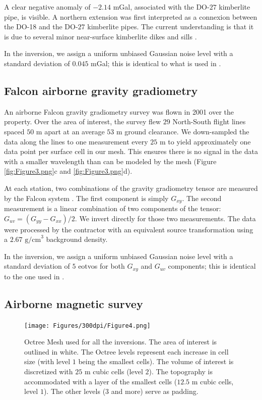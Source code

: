 \documentclass[paper, twocolumn]{geophysics} %
\begin{document}
A clear negative anomaly of $-2.14$ mGal, associated with the DO-$27$ kimberlite pipe, is visible. A northern extension was first interpreted as a connexion between the DO-18 and the DO-$27$ kimberlite pipes. The current understanding is that it is due to several minor near-surface kimberlite dikes and sills \citep{Doyle}.

In the inversion, we assign a uniform unbiased Gaussian noise level with a standard deviation of $0.045$ mGal; this is identical to what is used in \citet{TKCpaper}.

\subsection{Falcon airborne gravity gradiometry}

An airborne Falcon gravity gradiometry survey was flown in 2001 over the property. Over the area of interest, the survey flew $29$ North-South flight lines spaced $50$ m apart at an average $53$ m ground clearance. We down-sampled the data along the lines to one measurement every $25$ m to yield approximately one data point per surface cell in our mesh. This ensures there is no signal in the data with a smaller wavelength than can be modeled by the mesh (Figure \ref{fig:Figure3.png}c and \ref{fig:Figure3.png}d).

At each station, two combinations of the gravity gradiometry tensor \citep{GG} are measured by the Falcon system \citep{FalconPaper}. The first component is simply $G_{xy}$. The second measurement is a linear combination of two components of the tensor: $G_{uv} = (G_{yy}-G_{xx}) / 2$. We invert directly for those two measurements. The data were processed by the contractor with an equivalent source transformation using a $2.67 \text{ g/cm}^3$ background density.

In the inversion, we assign a uniform unbiased Gaussian noise level with a standard deviation of $5$ eotvos for both $G_{xy}$ and $G_{uv}$ components; this is identical to the one used in \citet{TKCpaper}.

\subsection{Airborne magnetic survey}


\begin{figure}
\centering
\texttt{[image: Figures/300dpi/Figure4.png]}
\caption{Octree Mesh used for all the inversions. The area of interest is outlined in white. The Octree levels represent each increase in cell size (with level $1$ being the smallest cells). The volume of interest is discretized with $25$ m cubic cells (level $2$). The topography is accommodated with a layer of the smallest cells ($12.5$ m cubic cells, level $1$). The other levels ($3$ and more) serve as padding.}
\label{fig:Figure4.png}
\end{figure}
\end{document}
